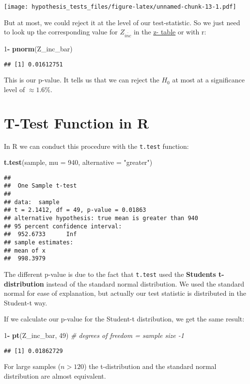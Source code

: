\documentclass[]{article}
\newenvironment{Shaded}{\begin{snugshade}}{\end{snugshade}}
\newcommand{\KeywordTok}[1]{\textcolor[rgb]{0.13,0.29,0.53}{\textbf{#1}}}
\newcommand{\DataTypeTok}[1]{\textcolor[rgb]{0.13,0.29,0.53}{#1}}
\newcommand{\DecValTok}[1]{\textcolor[rgb]{0.00,0.00,0.81}{#1}}
\newcommand{\StringTok}[1]{\textcolor[rgb]{0.31,0.60,0.02}{#1}}
\newcommand{\CommentTok}[1]{\textcolor[rgb]{0.56,0.35,0.01}{\textit{#1}}}
\newcommand{\OperatorTok}[1]{\textcolor[rgb]{0.81,0.36,0.00}{\textbf{#1}}}
\newcommand{\NormalTok}[1]{#1}
\begin{document}
\texttt{[image: hypothesis\_tests\_files/figure-latex/unnamed-chunk-13-1.pdf]}

But at most, we could reject it at the level of our test-statistic. So
we just need to look up the corresponding value for \(Z_\bar{inc}\) in
the \href{http://www.z-table.com/}{z- table} or with r:

\begin{Shaded}
\begin{Highlighting}[]
\DecValTok{1}\OperatorTok{-}\StringTok{ }\KeywordTok{pnorm}\NormalTok{(Z_inc_bar)}
\end{Highlighting}
\end{Shaded}

\begin{verbatim}
## [1] 0.01612751
\end{verbatim}

This is our p-value. It tells us that we can reject the \(H_0\) at most
at a significance level of \(\approx 1.6 \%\).

\section{T-Test Function in R}\label{t-test-function-in-r}

In R we can conduct this procedure with the \texttt{t.test} function:

\begin{Shaded}
\begin{Highlighting}[]
\KeywordTok{t.test}\NormalTok{(sample, }\DataTypeTok{mu =} \DecValTok{940}\NormalTok{, }\DataTypeTok{alternative =} \StringTok{"greater"}\NormalTok{)}
\end{Highlighting}
\end{Shaded}

\begin{verbatim}
## 
##  One Sample t-test
## 
## data:  sample
## t = 2.1412, df = 49, p-value = 0.01863
## alternative hypothesis: true mean is greater than 940
## 95 percent confidence interval:
##  952.6733      Inf
## sample estimates:
## mean of x 
##  998.3979
\end{verbatim}

The different p-value is due to the fact that \texttt{t.test} used the
\textbf{Students t-distribution} instead of the standard normal
distribution. We used the standard normal for ease of explanation, but
actually our test statistic is distributed in the Student-t way.

If we calculate our p-value for the Student-t distribution, we get the
same result:

\begin{Shaded}
\begin{Highlighting}[]
\DecValTok{1}\OperatorTok{-}\StringTok{ }\KeywordTok{pt}\NormalTok{(Z_inc_bar, }\DecValTok{49}\NormalTok{) }\CommentTok{# degrees of freedom = sample size -1 }
\end{Highlighting}
\end{Shaded}

\begin{verbatim}
## [1] 0.01862729
\end{verbatim}

For large samples (\(n > 120\)) the t-distribution and the standard
normal distribution are almost equivalent.
\end{document}
